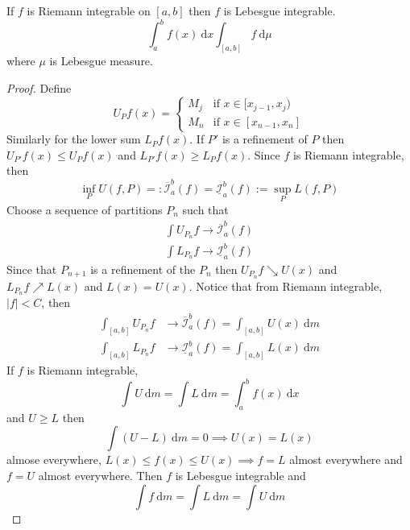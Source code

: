 \begin{theorem}
  If $f$ is Riemann integrable on $[a, b]$ then $f$ is Lebesgue integrable.
  \[\int_a^b f(x)\ \mathrm{d}x \int_{[a, b]}f \ \mathrm{d}\mu\]
  where $\mu$ is Lebesgue measure.
\end{theorem}

\begin{proof}
  Define
  \[U_Pf(x) = \begin{cases}
    M_j & \text{if } x \in [x_{j-1}, x_j) \\
    M_n & \text{if } x \in [x_{n-1}, x_n]
  \end{cases}\]
  Similarly for the lower sum $L_Pf(x)$. 
  If $P'$ is a refinement of $P$ then $U_{P'}f(x) \le U_Pf(x)$ and $L_{P'}f(x) \ge L_Pf(x)$.
  Since $f$ is Riemann integrable, then
  \[\inf_P U(f, P) =: \overline{\mathcal{I}}_a^b(f) = \underline{\mathcal{I}}_a^b(f) := \sup_P L(f, P)\]
  Choose a sequence of partitions $P_n$ such that
  \begin{align*}
    \int U_{P_n}f \to \overline{\mathcal{I}}_a^b(f) \\
    \int L_{P_n}f \to \underline{\mathcal{I}}_a^b(f)
  \end{align*}
  Since that $P_{n+1}$ is a refinement of the $P_n$ then $U_{P_n}f \searrow U(x)$ and 
  $L_{P_n}f \nearrow L(x)$ and $L(x) = U(x)$.
  Notice that from Riemann integrable, $|f| < C$, then
  \begin{align*}
    \int_{[a, b]} U_{P_n}f &\to \overline{\mathcal{I}}_a^b(f) = \int_{[a, b]} U(x)\ \mathrm{d}m\\
    \int_{[a, b]} L_{P_n}f &\to \underline{\mathcal{I}}_a^b(f) =\int_{[a, b]} L(x)\ \mathrm{d}m
  \end{align*}
  If $f$ is Riemann integrable, 
  \[\int U \ \mathrm{d}m = \int L \ \mathrm{d}m = \int_a^b f(x) \ \mathrm{d}x\]
  and $U \ge L$ then
  \[\int (U-L)\ \mathrm{d}m = 0 \implies U(x) = L(x)\]
  almose everywhere, $L(x) \le f(x) \le U(x) \implies f = L$ almost everywhere and $f = U$ almost everywhere.
  Then $f$ is Lebesgue integrable and
  \[\int f \ \mathrm{d}m = \int L \ \mathrm{d}m = \int U \ \mathrm{d}m\]
\end{proof}